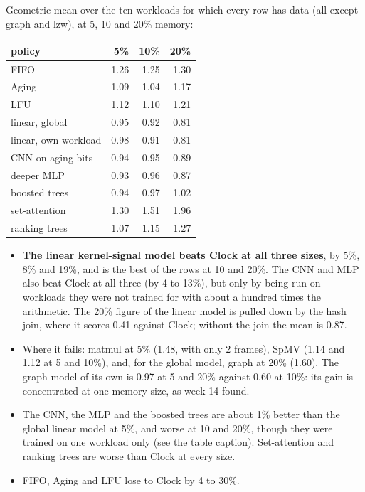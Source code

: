 \documentclass[10.5pt,a4paper]{article}
\newcommand{\best}[1]{\textbf{\textcolor{good}{#1}}}
\begin{document}
\begin{table}[h]
\centering\scriptsize

\caption{10\% memory, same layout and the same streams.}
\end{table}

\begin{table}[h]
\centering\scriptsize

\caption{20\% memory, same layout and the same streams.}
\end{table}

Geometric mean over the ten workloads for which every row has data (all except graph and lzw), at 5, 10 and 20\% memory:

\begin{center}\small
\begin{tabular}{lrrr}
\toprule
policy & 5\% & 10\% & 20\% \\
\midrule
FIFO & 1.26 & 1.25 & 1.30 \\
Aging & 1.09 & 1.04 & 1.17 \\
LFU & 1.12 & 1.10 & 1.21 \\
linear, global & 0.95 & 0.92 & 0.81 \\
linear, own workload & 0.98 & 0.91 & 0.81 \\
CNN on aging bits & 0.94 & 0.95 & 0.89 \\
deeper MLP & 0.93 & 0.96 & 0.87 \\
boosted trees & 0.94 & 0.97 & 1.02 \\
set-attention & 1.30 & 1.51 & 1.96 \\
ranking trees & 1.07 & 1.15 & 1.27 \\
\bottomrule
\end{tabular}
\end{center}

\begin{itemize}
\item \best{The linear kernel-signal model beats Clock at all three sizes}, by 5\%, 8\% and 19\%, and is the best of the rows at 10 and 20\%. The CNN and MLP also
  beat Clock at all three (by 4 to 13\%), but only by being run on workloads they were not trained for with about a hundred times the arithmetic. The 20\% figure of
  the linear model is pulled down by the hash join, where it scores 0.41 against Clock; without the join the mean is 0.87.
\item Where it fails: matmul at 5\% (1.48, with only 2 frames), SpMV (1.14 and 1.12 at 5 and 10\%), and, for the global model, graph at 20\% (1.60).
  The graph model of its own is 0.97 at 5 and 20\% against 0.60 at 10\%: its gain is concentrated at one memory size, as week 14 found.
\item The CNN, the MLP and the boosted trees are about 1\% better than the global linear model at 5\%, and worse at 10 and 20\%, though they were trained on
  one workload only (see the table caption). Set-attention and ranking trees are worse than Clock at every size.
\item FIFO, Aging and LFU lose to Clock by 4 to 30\%.
\end{itemize}
\end{document}
